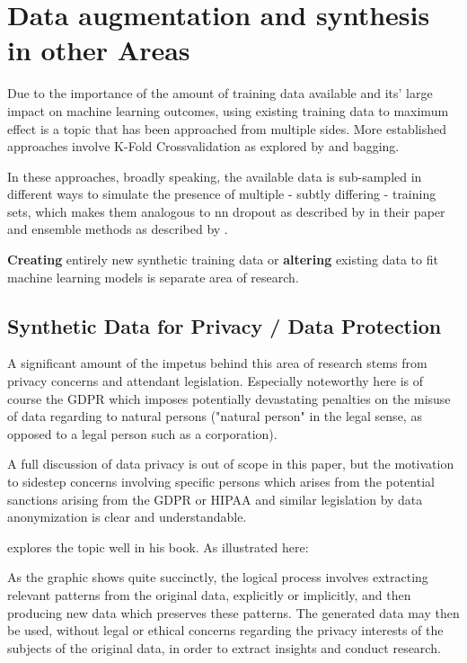 \chapter{Data augmentation and synthesis in other Areas}
\label{chapter:synthetic_data}

Due to the importance of the amount of training data available and its' large impact on machine learning outcomes, using existing training data to maximum effect is a topic that has been approached from multiple sides. More established approaches involve K-Fold Crossvalidation as explored by \cite{kfold} and \ac{bagging}. 

In these approaches, broadly speaking, the available data is sub-sampled in different ways to simulate the presence of multiple - subtly differing - training sets, which makes them analogous to \ac{nn} dropout as described by \cite{srivastava2014dropout} in their paper and ensemble methods as described by \cite{dietterich2000ensemble}.

\textbf{Creating} entirely new synthetic training data or \textbf{altering} existing data to fit machine learning models is separate area of research. 

\pagebreak

\section{Synthetic Data for Privacy / Data Protection}

A significant amount of the impetus behind this area of research stems from privacy concerns and attendant legislation. 
Especially noteworthy here is of course the \ac{GDPR} which imposes potentially devastating penalties on the misuse of data regarding to natural persons ("natural person" in the legal sense, as opposed to a legal person such as a corporation). 

A full discussion of data privacy is out of scope in this paper, but the motivation to sidestep concerns involving specific persons which arises from the potential sanctions arising from the \ac{GDPR} or \ac{HIPAA} and similar legislation by data anonymization is clear and understandable.

\cite{el2020practical} explores the topic well in his book. As illustrated here:


As the graphic shows quite succinctly, the logical process involves extracting relevant patterns from the original data, explicitly or implicitly, and then producing new data which preserves these patterns. 
The generated data may then be used, without legal or ethical concerns regarding the privacy interests of the subjects of the original data, in order to extract insights and conduct research.

